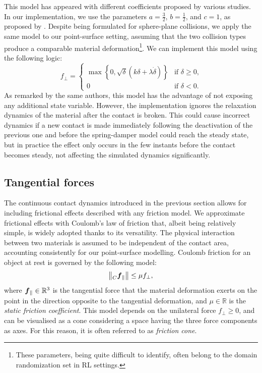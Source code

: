This model has appeared with different coefficients proposed by various studies.
In our implementation, we use the parameters $a = \frac{3}{2}$, $b=\frac{1}{2}$, and $c=1$, as proposed by \textcite{azad_modeling_2010}.
Despite being formulated for sphere-plane collisions, we apply the same model to our point-surface setting,
assuming that the two collision types produce a comparable material deformation\footnote{These parameters, being quite difficult to identify, often belong to the domain randomization set in \ac{RL} settings.}.
We can implement this model using the following logic:
%
\begin{equation*}
    f_\perp = 
    \begin{cases}
        \max\left\{ 0, \sqrt\delta (k \delta + \lambda \dot\delta) \right\} & \text{if $\delta\geq0$,} \\
        0 & \text{if $\delta<0$.}
    \end{cases}
\end{equation*}
%
As remarked by the same authors, this model has the advantage of not exposing any additional state variable.
However, the implementation ignores the relaxation dynamics of the material after the contact is broken.
This could cause incorrect dynamics if a new contact is made immediately following the deactivation of the previous one and before the spring-damper model could reach the steady state, but in practice the effect only occurs in the few instants before the contact becomes steady, not affecting the simulated dynamics significantly.

\subsection{Tangential forces}

The continuous contact dynamics introduced in the previous section allows for including frictional effects described with any friction model.
We approximate frictional effects with Coulomb's law of friction that, albeit being relatively simple, is widely adopted thanks to its versatility.
The physical interaction between two materials is assumed to be independent of the contact area, accounting consistently for our point-surface modelling.
Coulomb friction for an object at rest is governed by the following model:
%
\begin{equation*}
    \norm{\forcelin[C]_\parallel} \leq \mu f_\perp
    ,
\end{equation*}
%
where $\forcelin_\parallel \in \mathbb{R}^3$ is the tangential force that the material deformation exerts on the point in the direction opposite to the tangential deformation, and $\mu \in \mathbb{R}$ is the \emph{static friction coefficient}.
This model depends on the unilateral force $f_\perp \geq 0$, and can be visualised as a cone considering a space having the three force components as axes.
For this reason, it is often referred to as \emph{friction cone}.

